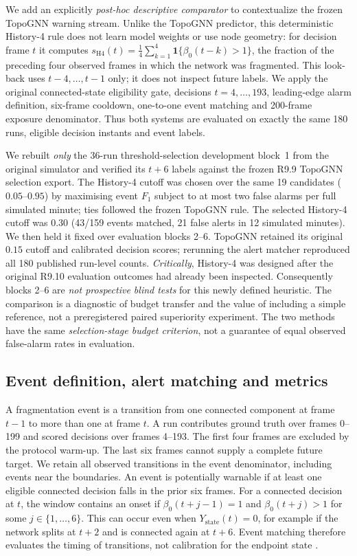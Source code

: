 \documentclass[10pt,a4paper]{article}
\begin{document}
We add an explicitly \emph{post-hoc descriptive comparator} to contextualize the frozen TopoGNN warning stream. Unlike the TopoGNN predictor, this deterministic History-4 rule does not learn model weights or use node geometry: for decision frame $t$ it computes $s_{\mathrm{H4}}(t)=\frac{1}{4}\sum_{k=1}^{4}\mathbf{1}\{\beta_0(t-k)>1\}$, the fraction of the preceding four observed frames in which the network was fragmented. This look-back uses $t-4,\ldots,t-1$ only; it does not inspect future labels. We apply the original connected-state eligibility gate, decisions $t=4,\ldots,193$, leading-edge alarm definition, six-frame cooldown, one-to-one event matching and 200-frame exposure denominator. Thus both systems are evaluated on exactly the same 180 runs, eligible decision instants and event labels.

We rebuilt \emph{only} the 36-run threshold-selection development block~1 from the original simulator and verified its $t+6$ labels against the frozen R9.9 TopoGNN selection export. The History-4 cutoff was chosen over the same 19 candidates ($0.05$--$0.95$) by maximising event $F_1$ subject to at most two false alarms per full simulated minute; ties followed the frozen TopoGNN rule. The selected History-4 cutoff was $0.30$ (43/159 events matched, 21 false alerts in 12 simulated minutes). We then held it fixed over evaluation blocks 2--6. TopoGNN retained its original $0.15$ cutoff and calibrated decision scores; rerunning the alert matcher reproduced all 180 published run-level counts. \emph{Critically}, History-4 was designed after the original R9.10 evaluation outcomes had already been inspected. Consequently blocks 2--6 are \emph{not prospective blind tests} for this newly defined heuristic. The comparison is a diagnostic of budget transfer and the value of including a simple reference, not a preregistered paired superiority experiment. The two methods have the same \emph{selection-stage budget criterion}, not a guarantee of equal observed false-alarm rates in evaluation.

\subsection{Event definition, alert matching and metrics}

A fragmentation event is a transition from one connected component at frame \(t-1\) to more than one at frame \(t\). A run contributes ground truth over frames 0--199 and scored decisions over frames 4--193. The first four frames are excluded by the protocol warm-up. The last six frames cannot supply a complete future target. We retain all observed transitions in the event denominator, including events near the boundaries. An event is potentially warnable if at least one eligible connected decision falls in the prior six frames. For a connected decision at \(t\), the window contains an onset if \(\beta_0(t+j-1)=1\) and \(\beta_0(t+j)>1\) for some \(j\in\{1,\ldots,6\}\). This can occur even when \(Y_{\mathrm{state}}(t)=0\), for example if the network splits at \(t+2\) and is connected again at \(t+6\). Event matching therefore evaluates the timing of transitions, not calibration for the endpoint state \cite{tatbul2018precision}.
\end{document}
